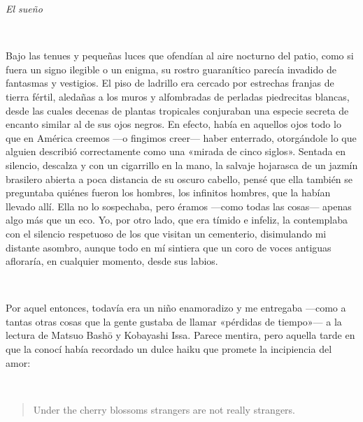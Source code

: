 \documentclass[a4paper, 12pt]{article}
\begin{document}
\textit{El sueño} 

~ 


Bajo las tenues y pequeñas luces que ofendían al aire nocturno del patio, como
si fuera un signo ilegible o un enigma, su rostro guaranítico parecía invadido
de fantasmas y vestigios. El piso de ladrillo era cercado por estrechas franjas
de tierra fértil, aledañas a los muros y alfombradas de perladas piedrecitas
blancas, desde las cuales decenas de plantas tropicales conjuraban una especie
secreta de encanto similar al de sus ojos negros. En efecto, había en aquellos
ojos todo lo que en América creemos —o fingimos creer— haber enterrado,
otorgándole lo que alguien describió correctamente como una «mirada de cinco
siglos». Sentada en silencio, descalza y con un cigarrillo en la mano, la
salvaje hojarasca de un jazmín brasilero abierta a poca distancia de su oscuro
cabello, pensé que ella también se preguntaba quiénes fueron los hombres, los
infinitos hombres, que la habían llevado allí. Ella no lo sospechaba, pero éramos
—como todas las cosas— apenas algo más que un eco. Yo, por otro lado, que era
tímido e infeliz, la contemplaba con el silencio respetuoso de los que visitan
un cementerio, disimulando mi distante asombro, aunque todo en mí sintiera que
un coro de voces antiguas afloraría, en cualquier momento, desde sus labios.

~

Por aquel entonces, todavía era un niño enamoradizo y me entregaba —como a
tantas otras cosas que la gente gustaba de llamar «pérdidas de tiempo»— a la
lectura de Matsuo Bashō y Kobayashi Issa. Parece mentira, pero aquella tarde en
que la conocí había recordado un dulce haiku que promete la incipiencia del
amor:

~
\begin{quote}
Under the cherry blossoms\newline
strangers are not\newline
really strangers.
\end{quote}

~
\end{document}
